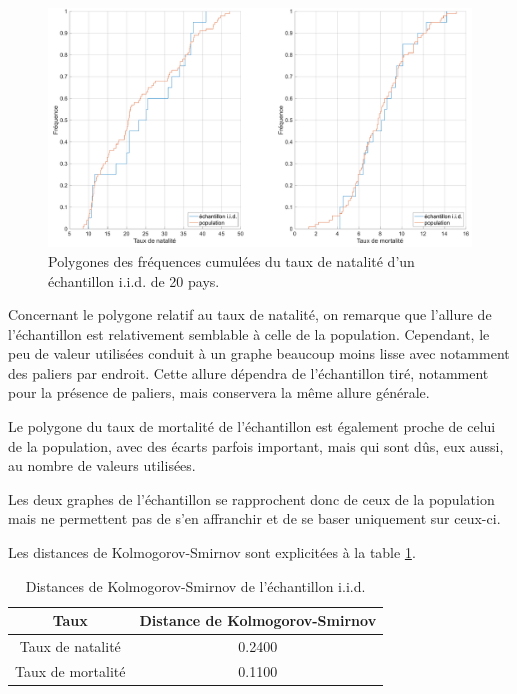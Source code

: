 \documentclass[a4paper, 12pt]{article}
\begin{document}
	\begin{figure}[!ht]
	    \centering
	    \includegraphics[width=\textwidth]{resources/pdf/figures/Q2aiii.pdf}
	    \caption{Polygones des fréquences cumulées du taux de natalité d'un échantillon i.i.d. de 20 pays.}
	    \label{fig:Q2aiii}
	\end{figure}
	
	Concernant le polygone relatif au taux de natalité, on remarque que l'allure de l'échantillon est relativement semblable à celle de la population. Cependant, le peu de valeur utilisées conduit à un graphe beaucoup moins lisse avec notamment des paliers par endroit. Cette allure dépendra de l'échantillon tiré, notamment pour la présence de paliers, mais conservera la même allure générale.\par
	
	Le polygone du taux de mortalité de l'échantillon est également proche de celui de la population, avec des écarts parfois important, mais qui sont dûs, eux aussi, au nombre de valeurs utilisées.\par
	
	Les deux graphes de l'échantillon se rapprochent donc de ceux de la population mais ne permettent pas de s'en affranchir et de se baser uniquement sur ceux-ci.\par
	
	Les distances de Kolmogorov-Smirnov sont explicitées à la table \ref{tab:Q2aiii}.\par
	
	\begin{table}[!ht]
	    \centering
	    \begin{tabular}{|c|c|}
	        \hline
	        \textbf{Taux} & \textbf{Distance de Kolmogorov-Smirnov}\\ \hline
	        \hline
	        Taux de natalité & \num{0.2400}\\ \hline
	        Taux de mortalité & \num{0.1100}\\ \hline
	    \end{tabular}
	    \caption{Distances de Kolmogorov-Smirnov de l'échantillon i.i.d.}
	    \label{tab:Q2aiii}
	\end{table}
	
\end{document}
